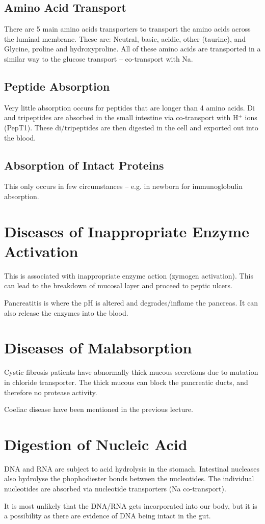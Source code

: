 \subsection{Amino Acid Transport}

There are 5 main amino acids transporters to transport the amino acids across the luminal membrane.
These are: Neutral, basic, acidic, other (taurine), and Glycine, proline and hydroxyproline.
All of these amino acids are transported in a similar way to the glucose transport -- co-transport with Na.

\subsection{Peptide Absorption}

Very little absorption occurs for peptides that are longer than 4 amino acids.
Di and tripeptides are absorbed in the small intestine via co-transport with H$^+$ ions (PepT1).
These di/tripeptides are then digested in the cell and exported out into the blood.

\subsection{Absorption of Intact Proteins}

This only occurs in few circumstances -- e.g. in newborn for immunoglobulin absorption.

\section{Diseases of Inappropriate Enzyme Activation}

This is associated with inappropriate enzyme action (zymogen activation).
This can lead to the breakdown of mucosal layer and proceed to peptic ulcers.

Pancreatitis is where the pH is altered and degrades/inflame the pancreas.
It can also release the enzymes into the blood.

\section{Diseases of Malabsorption}

Cystic fibrosis patients have abnormally thick mucous secretions due to mutation in chloride transporter.
The thick mucous can block the pancreatic ducts, and therefore no protease activity.

Coeliac disease have been mentioned in the previous lecture.

\section{Digestion of Nucleic Acid}

DNA and RNA are subject to acid hydrolysis in the stomach.
Intestinal nucleases also hydrolyse the phophodiester bonds between the nucleotides.
The individual nucleotides are absorbed via nucleotide transporters (Na co-transport).

It is most unlikely that the DNA/RNA gets incorporated into our body, but it is a possibility as there are evidence of DNA being intact in the gut.

